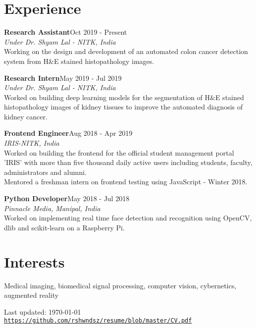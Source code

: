 \documentclass[letterpaper]{article}
\def\footerlink{https://github.com/rshwndsz/resume/blob/master/CV.pdf}
\renewenvironment{itemize}{
  \begin{list}{}{
    \setlength{\leftmargin}{1.5em}
  }
}{
  \end{list}
}
\begin{document}
\section*{Experience}
  \begin{itemize}
    \item \textbf{Research Assistant}\hfill{Oct 2019 - Present}\\
    \textit{Under Dr. Shyam Lal - NITK, India}\\
    Working on the design and development of an automated colon cancer detection system from H\&E stained histopathology images.

    \item \textbf{Research Intern}\hfill{May 2019 - Jul 2019}\\
    \textit{Under Dr. Shyam Lal - NITK, India}\\
    Worked on building deep learning models for the segmentation of H\&E stained histopathology images of kidney tissues to improve the automated diagnosis of kidney cancer.

    \item \textbf{Frontend Engineer}\hfill{Aug 2018 - Apr 2019}\\
    \textit{IRIS-NITK, India}\\
    Worked on building the frontend for the official student management portal 'IRIS' with more than five thousand daily active users including students, faculty, administrators and alumni.\\
    Mentored a freshman intern on frontend testing using JavaScript - Winter 2018.

    \item \textbf{Python Developer}\hfill{May 2018 - Jul 2018}\\
    \textit{Pinnacle Media, Manipal, India}\\
    Worked on implementing real time face detection and recognition using OpenCV, dlib and scikit-learn on a Raspberry Pi.
  \end{itemize}

\section*{Interests}
  \begin{itemize}
    \item Medical imaging, biomedical signal processing, computer vision, cybernetics, augmented reality
  \end{itemize}

\bigskip

\begin{center}
  \begin{footnotesize}
    Last updated: \today \\
    \href{\footerlink}{\texttt{\footerlink}}
  \end{footnotesize}
\end{center}
\end{document}
